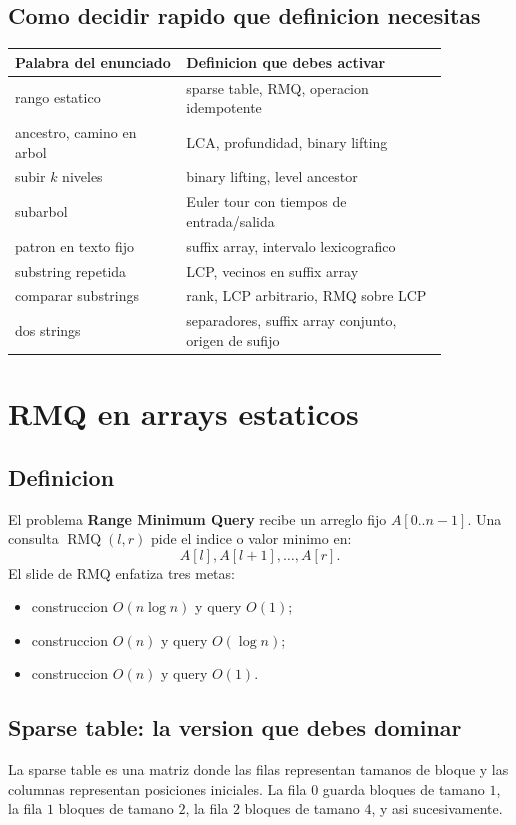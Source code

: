 \documentclass[10pt]{article}
\newcommand{\bigO}{O}
\newcommand{\RMQ}{\operatorname{RMQ}}
\begin{document}
\subsection{Como decidir rapido que definicion necesitas}
\begin{center}
\begin{tabular}{p{0.34\linewidth}p{0.52\linewidth}}
\toprule
Palabra del enunciado & Definicion que debes activar \\
\midrule
rango estatico & sparse table, RMQ, operacion idempotente \\
ancestro, camino en arbol & LCA, profundidad, binary lifting \\
subir $k$ niveles & binary lifting, level ancestor \\
subarbol & Euler tour con tiempos de entrada/salida \\
patron en texto fijo & suffix array, intervalo lexicografico \\
substring repetida & LCP, vecinos en suffix array \\
comparar substrings & rank, LCP arbitrario, RMQ sobre LCP \\
dos strings & separadores, suffix array conjunto, origen de sufijo \\
\bottomrule
\end{tabular}
\end{center}

\newpage
\section{RMQ en arrays estaticos}

\subsection{Definicion}
El problema \textbf{Range Minimum Query} recibe un arreglo fijo $A[0..n-1]$.
Una consulta $\RMQ(l,r)$ pide el indice o valor minimo en:
\[
A[l], A[l+1], \ldots, A[r].
\]
El slide de RMQ enfatiza tres metas:
\begin{itemize}[leftmargin=*]
\item construccion $\bigO(n\log n)$ y query $\bigO(1)$;
\item construccion $\bigO(n)$ y query $\bigO(\log n)$;
\item construccion $\bigO(n)$ y query $\bigO(1)$.
\end{itemize}

\subsection{Sparse table: la version que debes dominar}
La sparse table es una matriz donde las filas representan tamanos de bloque y
las columnas representan posiciones iniciales. La fila $0$ guarda bloques de
tamano $1$, la fila $1$ bloques de tamano $2$, la fila $2$ bloques de tamano
$4$, y asi sucesivamente.
\end{document}
